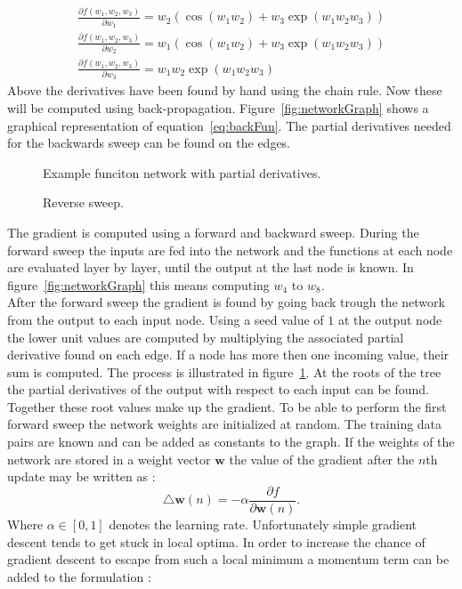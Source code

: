\begin{align}
\frac{\partial f(w_1,w_2,w_3)}{\partial w_1} = w_2 (\cos(w_1 w_2) + w_3 \exp(w_1 w_2 w_3)) \\
\frac{\partial f(w_1,w_2,w_3)}{\partial w_2} = w_1 (\cos(w_1 w_2) + w_3 \exp(w_1 w_2 w_3)) \\
\frac{\partial f(w_1,w_2,w_3)}{\partial w_3} = w_1  w_2 \exp(w_1 w_2 w_3)
\end{align}
Above the derivatives have been found by hand using the chain rule. Now these will be computed using back-propagation. Figure~\ref{fig:networkGraph} shows a graphical representation of equation~\ref{eq:backFun}. The partial derivatives needed for the backwards sweep can be found on the edges. \\
\begin{figure}
\centering

\caption{Example funciton network with partial derivatives.}
\label{fig:networkGraph}

\caption{Reverse sweep.}
\label{fig:reverseSweep}
\end{figure}
The gradient is computed using a forward and backward sweep. During the forward sweep the inputs are fed into the network and the functions at each node are evaluated layer by layer, until the output at the last node is known. In figure~\ref{fig:networkGraph} this means computing $w_4$ to $w_8$. \\
After the forward sweep the gradient is found by going back trough the network from the output to each input node. Using a seed value of $1$ at the output node the lower unit values are computed by multiplying the associated partial derivative found on each edge. If a node has more then one incoming value, their sum is computed. The process is illustrated in figure~\ref{fig:reverseSweep}. At the roots of the tree the partial derivatives of the output with respect to each input can be found. Together these root values make up the gradient.
To be able to perform the first forward sweep the network weights are initialized at random. The training data pairs are known and can be added as constants to the graph.
If the weights of the network are stored in a weight vector $\mathbf{w}$ the value of the gradient after the $n$th update may be written as \cite[page 27]{Graves2008}:
\begin{equation}
\triangle \mathbf{w}(n) = -\alpha \frac{\partial f}{\partial \mathbf{w}(n)}.
\end{equation}
Where $\alpha \in [0,1]$ denotes the learning rate. Unfortunately simple gradient descent tends to get stuck in local optima. In order to increase the chance of gradient descent to escape from such a local minimum a momentum term can be added to the formulation \cite[page 267]{Bishop1995}\cite[page 27]{Graves2008}:
